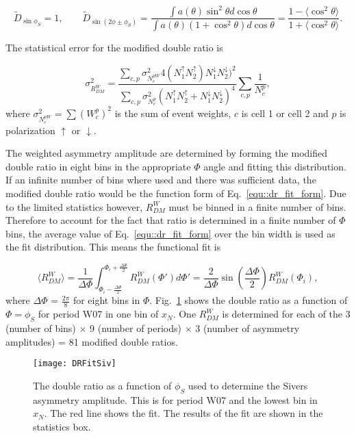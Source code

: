 \begin{equation}
  \tilde{D}_{\sin\phi_S} = 1, \quad\quad \tilde{D}_{\sin(2\phi\pm\phi_S)} =
  \frac{\int a(\theta)\sin^2\theta d\cos\theta} {\int a(\theta)(1+\cos^2\theta)
    d\cos\theta} = \frac{1-\langle \cos^2\theta\rangle} {1+\langle
    \cos^2\theta\rangle}.
\end{equation}

The statistical error for the modified double ratio is

\begin{equation}
  \sigma^2_{R^W_{DM}} = \frac{\sum_{c,p} \sigma^2_{N_c^{pW}}
    4(N^{\uparrow}_1N^{\uparrow}_2)N^{\downarrow}_1N^{\downarrow}_2)^2}
        {\sum_{c,p} \sigma^2_{N_c^{p}}
          (N^{\uparrow}_1N^{\uparrow}_2 + N^{\downarrow}_1N^{\downarrow}_2)^4}
        \sum_{c,p}\frac{1}{N_c^p},
\end{equation}
\noindent
where $\sigma^2_{N_c^{pW}} = \sum (W^p_c)^2$ is the sum of event weights, $c$ is
cell 1 or cell 2 and $p$ is polarization $\uparrow$ or $\downarrow$.

The weighted asymmetry amplitude are determined by forming the modified double
ratio in eight bins in the appropriate $\Phi$ angle and fitting this
distribution.  If an infinite number of bins where used and there was sufficient
data, the modified double ratio would be the function form of
Eq.~\ref{equ::dr_fit_form}.  Due to the limited statistics however, $R^W_{DM}$
must be binned in a finite number of bins.  Therefore to account for the fact
that ratio is determined in a finite number of $\Phi$ bins, the average value of
Eq.~\ref{equ::dr_fit_form} over the bin width is used as the fit distribution.
This means the functional fit is

\begin{equation}
  \langle R^W_{DM} \rangle = \frac{1}{\Delta\Phi}
  \int_{\Phi_i-\frac{\Delta\Phi}{2}}^{\Phi_i+\frac{\Delta\Phi}{2}}
  R^W_{DM}(\Phi') d\Phi' =
  \frac{2}{\Delta\Phi}\sin(\frac{\Delta\Phi}{2})R^W_{DM}(\Phi_i),
\end{equation}
\noindent
where $\Delta\Phi$ = $\frac{2\pi}{8}$ for eight bins in $\Phi$.
Fig.~\ref{fig::DRFitSiv} shows the double ratio as a function of $\Phi=\phi_S$
for period W07 in one bin of $x_N$.  One $R^W_{DM}$ is determined for each of
the 3 (number of bins) $\times$ 9 (number of periods) $\times$ 3 (number of
asymmetry amplitudes) = 81 modified double ratios.

\begin{figure}[h!t]
  \centering \texttt{[image: DRFitSiv]}
  \caption{The double ratio as a function of $\phi_S$ used to determine the
    Sivers asymmetry amplitude.  This is for period W07 and the lowest bin in
    $x_N$.  The red line shows the fit.  The results of the fit are shown in the
    statistics box.}
  \label{fig::DRFitSiv}
\end{figure}

